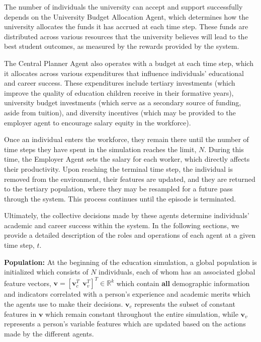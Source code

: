 The number of individuals the university can accept and support successfully depends on the University Budget Allocation Agent, which determines how the university allocates the funds it has accrued at each time step. These funds are distributed across various resources that the university believes will lead to the best student outcomes, as measured by the rewards provided by the system.

The Central Planner Agent also operates with a budget at each time step, which it allocates across various expenditures that influence individuals' educational and career success. These expenditures include tertiary investments (which improve the quality of education children receive in their formative years), university budget investments (which serve as a secondary source of funding, aside from tuition), and diversity incentives (which may be provided to the employer agent to encourage salary equity in the workforce).

Once an individual enters the workforce, they remain there until the number of time steps they have spent in the simulation reaches the limit, $N$. During this time, the Employer Agent sets the salary for each worker, which directly affects their productivity. Upon reaching the terminal time step, the individual is removed from the environment, their features are updated, and they are returned to the tertiary population, where they may be resampled for a future pass through the system. This process continues until the episode is terminated.

Ultimately, the collective decisions made by these agents determine individuals' academic and career success within the system. In the following sections, we provide a detailed description of the roles and operations of each agent at a given time step, $t$.

\textbf{Population:} 
At the beginning of the education simulation, a global population is initialized which consists of $N$ individuals, each of whom has an associated global feature vectors, $\mathbf{v}=[\mathbf{v}_{c}^{T} \ \  \mathbf{v}_{v}^{T}]^{T}\in\mathbb{R}^k$ which contain \textbf{all} demographic information and indicators correlated with a person's experience and academic merits which the agents use to make their decisions. $\mathbf{v}_{c}$ represents the subset of constant features in $\mathbf{v}$ which remain constant throughout the entire simulation, while $\mathbf{v}_{v}$ represents a person's variable features which are updated based on the actions made by the different agents. 


